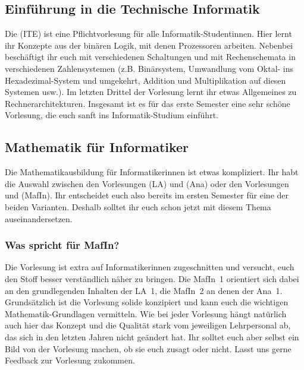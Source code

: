 \subsection{Einführung in die Technische Informatik}
\vspace{-1mm}
\label{info2}
Die  (\gls{ITE}) ist eine Pflichtvorlesung für alle Informatik-Studentinnen. Hier lernt ihr Konzepte aus der binären Logik, mit denen Prozessoren arbeiten. Nebenbei beschäftigt ihr euch mit verschiedenen Schaltungen und mit Rechenschemata in verschiedenen Zahlensystemen (z.B. Binärsystem, Umwandlung vom Oktal- ins Hexadezimal-System und umgekehrt, Addition und Multiplikation auf diesen Systemen usw.). Im letzten Drittel der Vorlesung lernt ihr etwas Allgemeines zu Rechnerarchitekturen. Insgesamt ist es für das erste Semester eine sehr schöne Vorlesung, die euch sanft ins Informatik-Studium einführt.

\vspace{-1mm}
\subsection{Mathematik für Informatiker}
\label{mafin}
Die Mathematikausbildung für Informatikerinnen ist etwas kompliziert. Ihr habt die Auswahl zwischen den Vorlesungen  (\gls{LA}) und  (\gls{Ana}) oder den Vorlesungen  und  (\gls{MafIn}). Ihr entscheidet euch also bereits im ersten Semester für eine der beiden Varianten. Deshalb solltet ihr euch schon jetzt mit diesem Thema auseinandersetzen.

\vspace{-1mm}
\subsubsection{Was spricht für MafIn?}
Die Vorlesung ist extra auf Informatikerinnen zugeschnitten und versucht, euch den Stoff besser verständlich näher zu bringen. Die \gls{MafIn}~1 orientiert sich dabei an den grundlegenden Inhalten der \gls{LA}~1, die \gls{MafIn}~2 an denen der \gls{Ana}~1. Grundsätzlich ist die Vorlesung solide konzipiert und kann euch die wichtigen Mathematik-Grundlagen vermitteln. Wie bei jeder Vorlesung hängt natürlich auch hier das Konzept und die Qualität stark vom jeweiligen Lehrpersonal ab, das sich in den letzten Jahren nicht geändert hat. Ihr solltet euch aber selbst ein Bild von der Vorlesung machen, ob sie euch zusagt oder nicht. Lasst uns gerne Feedback zur Vorlesung zukommen.

